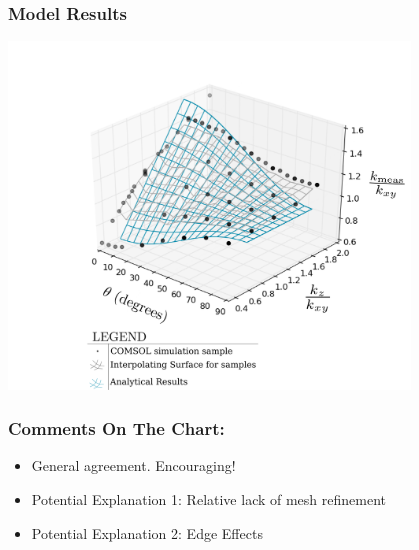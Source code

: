 \documentclass{beamer}
\begin{document}
\begin{frame}
\frametitle{Model Results}
\includegraphics[width=0.8\textwidth]{fig/numvanal.png}
\end{frame}


\begin{frame}
\frametitle{Comments On The Chart:}
\begin{itemize}
\item General agreement. Encouraging!
\item Potential Explanation 1: Relative lack of mesh refinement
\item Potential Explanation 2: Edge Effects
\end{itemize}
\end{frame}
\end{document}
